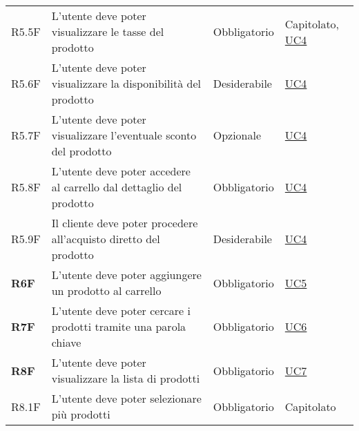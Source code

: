 \begin{center}
\begin{longtable}[!h]{p{50px} p{245px} p{75px} p{50px}}
        R5.5F                                 & L'utente deve poter visualizzare le tasse del prodotto                                                                                              & Obbligatorio             & Capitolato, \newline \hyperref[sec:UC4]{UC4}   \\
        R5.6F                                 & L'utente deve poter visualizzare la disponibilità del prodotto                                                                                      & Desiderabile             & \hyperref[sec:UC4]{UC4}                        \\
        R5.7F                                 & L'utente deve poter visualizzare l'eventuale sconto del prodotto                                                                                    & Opzionale                & \hyperref[sec:UC4]{UC4}                        \\
        R5.8F                                 & L'utente deve poter accedere al carrello dal dettaglio del prodotto                                                                                 & Obbligatorio             & \hyperref[sec:UC4]{UC4}                        \\
        R5.9F                                 & Il cliente deve poter procedere all'acquisto diretto del prodotto                                                                                   & Desiderabile             & \hyperref[sec:UC4]{UC4}                        \\
        \textbf{R6F}                          & L'utente deve poter aggiungere un prodotto al carrello                                                                                              & Obbligatorio             & \hyperref[sec:UC5]{UC5}                        \\
        \textbf{R7F}                          & L'utente deve poter cercare i prodotti tramite una parola chiave                                                                                    & Obbligatorio             & \hyperref[sec:UC6]{UC6}                        \\
        \textbf{R8F}                          & L'utente deve poter visualizzare la lista di prodotti                                                                                               & Obbligatorio             & \hyperref[sec:UC7]{UC7}                        \\
        R8.1F                                 & L'utente deve poter selezionare più prodotti                                                                                                        & Obbligatorio             & Capitolato                                     \\

\end{longtable}
\end{center}
